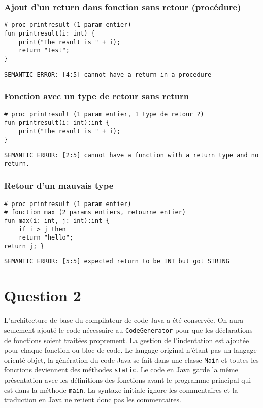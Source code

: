 \documentclass[fleqn]{article}
\begin{document}
    \subsubsection*{Ajout d'un return dans fonction sans retour (procédure)}
    \begin{lstlisting}
# proc printresult (1 param entier)
fun printresult(i: int) {
    print("The result is " + i);
    return "test";
}
    \end{lstlisting}
                
    \begin{lstlisting}
SEMANTIC ERROR: [4:5] cannot have a return in a procedure
    \end{lstlisting}


    \subsubsection*{Fonction avec un type de retour sans return}
    \begin{lstlisting}
# proc printresult (1 param entier, 1 type de retour ?)
fun printresult(i: int):int {
    print("The result is " + i);
}
    \end{lstlisting}
                
    \begin{lstlisting}
SEMANTIC ERROR: [2:5] cannot have a function with a return type and no return.
    \end{lstlisting}

    \subsubsection*{Retour d'un mauvais type}
    \begin{lstlisting}
# proc printresult (1 param entier)
# fonction max (2 params entiers, retourne entier)
fun max(i: int, j: int):int {
    if i > j then
    return "hello";
return j; }
    \end{lstlisting}
                
    \begin{lstlisting}
SEMANTIC ERROR: [5:5] expected return to be INT but got STRING
    \end{lstlisting}

    \pagebreak
    \section*{Question 2}

    L'architecture de base du compilateur de code Java a été conservée. On aura seulement ajouté le code nécessaire au \verb'CodeGenerator' pour que les déclarations de fonctions soient traitées proprement. La gestion de l'indentation est ajoutée pour chaque fonction ou bloc de code. Le langage original n'étant pas un langage orienté-objet, la génération du code Java se fait dans une classe \verb'Main' et toutes les fonctions deviennent des méthodes \verb'static'. Le code en Java garde la même présentation avec les définitions des fonctions avant le programme principal qui est dans la méthode \verb'main'. La syntaxe initiale ignore les commentaires et la traduction en Java ne retient donc pas les commentaires.
\end{document}
